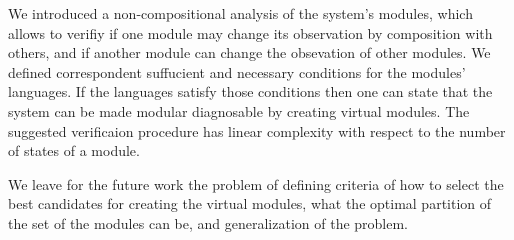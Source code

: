 \documentclass[a4paper, 10pt, conference]{ieeeconf}
\begin{document}
We introduced a non-compositional analysis of the system's modules, which allows
to verifiy if one module may change its observation by composition with others,
and if another module can change the obsevation of other modules. We defined
correspondent suffucient and necessary conditions for the modules' languages. If
the languages satisfy those conditions then one can state that the system can
be made modular diagnosable by creating virtual modules.
The suggested verificaion procedure has linear complexity with respect to the
number of states of a module.

We leave for the future work the problem of defining criteria of how to select
the best candidates for creating the virtual modules, what the optimal
partition of the set of the modules can be, and generalization of the problem.






\end{document}
